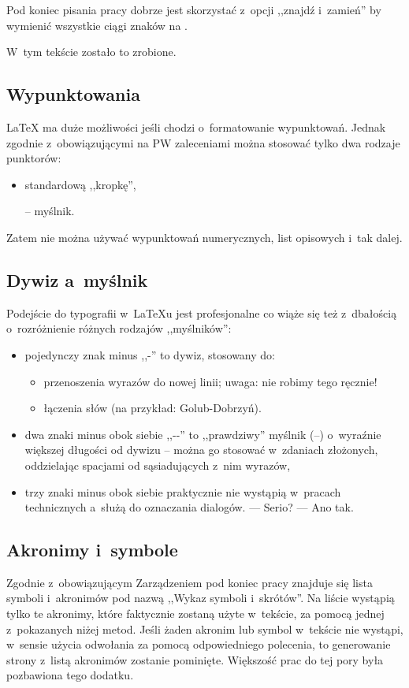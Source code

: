 Pod koniec pisania pracy dobrze jest skorzystać z~opcji ,,znajdź i~zamień'' by wymienić wszystkie ciągi znaków  na .

W~tym tekście zostało to zrobione.

\subsection{Wypunktowania}
\LaTeX{} ma duże możliwości jeśli chodzi o~formatowanie wypunktowań. Jednak zgodnie z~obowiązującymi na PW zaleceniami można stosować tylko dwa rodzaje punktorów:
\begin{itemize}
    \item standardową ,,kropkę'',
    \item[--] myślnik.
\end{itemize}
Zatem nie można używać wypunktowań numerycznych, list opisowych i~tak dalej.


\subsection{Dywiz a~myślnik}
Podejście do typografii w~\LaTeX{u} jest profesjonalne co wiąże się też z~dbałością o~rozróżnienie różnych rodzajów ,,myślników'':
\begin{itemize}
    \item pojedynczy znak minus ,,-'' to dywiz, stosowany do:
    \begin{itemize}
        \item przenoszenia wyrazów do nowej linii; uwaga: nie robimy tego ręcznie!
        \item łączenia słów (na przykład: Golub-Dobrzyń).
    \end{itemize}
    \item dwa znaki minus obok siebie ,,-{}-'' %
    to ,,prawdziwy'' myślnik (--) o~wyraźnie większej długości od dywizu -- można go stosować w~zdaniach złożonych, oddzielając spacjami od sąsiadujących z~nim wyrazów,
    \item trzy znaki minus obok siebie praktycznie nie wystąpią w~pracach technicznych a~służą do oznaczania dialogów. --- Serio? --- Ano tak.
\end{itemize}

\subsection{Akronimy i~symbole}
Zgodnie z~obowiązującym Zarządzeniem pod koniec pracy znajduje się lista symboli i~akronimów pod nazwą ,,Wykaz symboli i~skrótów''. Na liście wystąpią tylko te akronimy, które faktycznie zostaną użyte w~tekście, za pomocą jednej z~pokazanych niżej metod. Jeśli żaden akronim lub symbol w~tekście nie wystąpi, w~sensie użycia odwołania za pomocą odpowiedniego polecenia, to generowanie strony z~listą akronimów zostanie pominięte. Większość prac do tej pory była pozbawiona tego dodatku.

